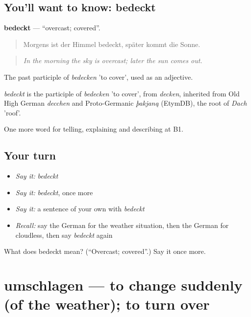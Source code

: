 \subsection*{You'll want to know: bedeckt}
\textbf{bedeckt} — \textquotedblleft{}overcast; covered\textquotedblright{}.

\begin{quote}
Morgens ist der Himmel bedeckt, später kommt die Sonne.
\end{quote}

\begin{quote}
\emph{In the morning the sky is overcast; later the sun comes out.}
\end{quote}

The past participle of \emph{bedecken} 'to cover', used as an adjective.

\begin{cousinweb}
\emph{bedeckt} is the participle of \emph{bedecken} 'to cover', from \emph{decken}, inherited from Old High German \emph{decchen} and Proto-Germanic \emph{þakjaną} (EtymDB), the root of \emph{Dach} 'roof'.
\end{cousinweb}

\begin{grammarlens}[title={What you've built}]
One more word for telling, explaining and describing at B1.
\end{grammarlens}

\subsection*{Your turn}
\begin{itemize}
\raggedright
  \item \emph{Say it:} \emph{bedeckt}
  \item \emph{Say it:} \emph{bedeckt}, once more
  \item \emph{Say it:} a sentence of your own with \emph{bedeckt}
  \item \emph{Recall:} say the German for the weather situation, then the German for cloudless, then say \emph{bedeckt} again
\end{itemize}

\begin{tcolorbox}[breakable,colback=teal!4,colframe=teal!35!black,title={Before you move on}]
What does bedeckt mean? (\textquotedblleft{}Overcast; covered\textquotedblright{}.) Say it once more.
\end{tcolorbox}
\section[umschlagen]{umschlagen — to change suddenly (of the weather); to turn over}

